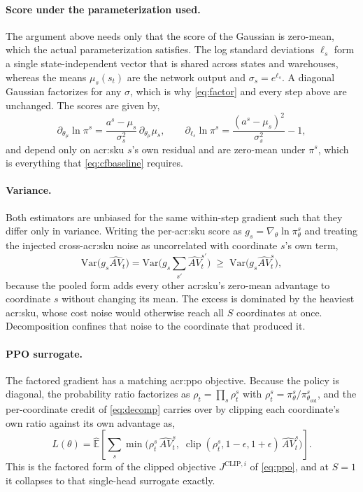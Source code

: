\paragraph{\textbf{Score under the parameterization used.}} The argument above needs only that the
score of the Gaussian is zero-mean, which the actual parameterization satisfies. The log standard deviations
$\ell_s$ form a single state-independent vector that is shared across states and warehouses, whereas the
means $\mu_s(s_t)$ are the network output and $\sigma_s=e^{\ell_s}$. A diagonal Gaussian factorizes for any $\sigma$, which is why \eqref{eq:factor} and every step above are unchanged. The scores are given by,
\begin{equation}
\partial_{\theta_\mu}\ln\pi^s=\frac{a^s-\mu_s}{\sigma_s^{2}}\,\partial_{\theta_\mu}\mu_s,
\qquad
\partial_{\ell_s}\ln\pi^s=\frac{(a^s-\mu_s)^2}{\sigma_s^{2}}-1,
\end{equation}
and depend only on \gls{acr:sku} $s$'s own residual and are zero-mean under $\pi^s$, which is everything that \eqref{eq:cfbaseline} requires.

\paragraph{\textbf{Variance.}} Both estimators are unbiased for the same within-step gradient such that they differ only in variance. Writing the per-\gls{acr:sku} score as
$g_s=\nabla_\theta\ln\pi_\theta^{s}$ and treating the injected cross-\gls{acr:sku} noise as
uncorrelated with coordinate $s$'s own term,
\begin{equation}
\mathrm{Var}\!\big(g_s \widehat{AV}_t\big)
=\mathrm{Var}\!\Big(g_s\textstyle\sum_{s'}\widehat{AV}_t^{s'}\Big)
\;\ge\;
\mathrm{Var}\!\big(g_s \widehat{AV}_t^{s}\big),
\end{equation}
because the pooled form adds every other \gls{acr:sku}'s zero-mean advantage to coordinate $s$
without changing its mean. The excess is dominated by the heaviest \gls{acr:sku}, whose cost noise
would otherwise reach all $S$ coordinates at once. Decomposition confines that noise to the
coordinate that produced it.

\paragraph{\textbf{PPO surrogate.}} The factored gradient has a matching \gls{acr:ppo} objective.
Because the policy is diagonal, the probability ratio factorizes as $\rho_t=\prod_s \rho_t^{s}$ with
$\rho_t^{s}=\pi_\theta^{s}/\pi_{\theta_{\mathrm{old}}}^{s}$, and the per-coordinate credit of
\eqref{eq:decomp} carries over by clipping each coordinate's own ratio against its own advantage as,
\begin{equation}
L(\theta)=\hat{\mathbb{E}}\!\left[\sum_{s}
\min\!\Big(\rho_t^{s}\,\widehat{AV}_t^{s},\;
\operatorname{clip}(\rho_t^{s},1-\epsilon,1+\epsilon)\,\widehat{AV}_t^{s}\Big)\right].
\label{eq:ppo-factored}
\end{equation}
This is the factored form of the clipped objective $J^{\mathrm{CLIP},i}$ of \eqref{eq:ppo}, and at
$S=1$ it collapses to that single-head surrogate exactly.

